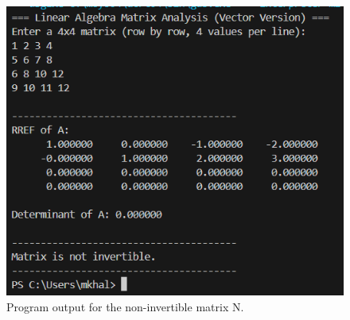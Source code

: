 \documentclass{article}
\begin{document}
\begin{figure}[h!]
    \centering
    \includegraphics[width=0.5\linewidth]{f2.png}
    \caption{Program output for the non-invertible matrix N.}
    \label{fig:enter-label}
\end{figure}
\end{document}
